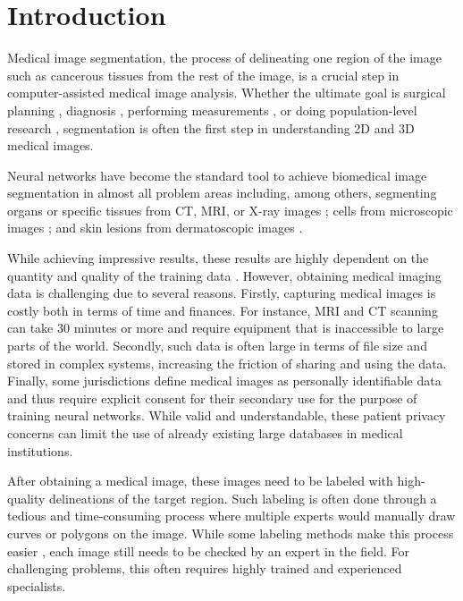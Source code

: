
\chapter{Introduction}
\label{chap:introduction}

Medical image segmentation, the process of delineating one region of the image such as cancerous tissues from the rest of the image, is a crucial step in computer-assisted medical image analysis. Whether the ultimate goal is surgical planning \cite{selleAnalysisVasculatureLiver2002}, diagnosis \cite{devunooruDeepLearningNeural2021}, performing measurements \cite{sobhaniniaFetalUltrasoundImage2019}, or doing population-level research \cite{bastarrikaRelationshipCoronaryArtery2010}, segmentation is often the first step in understanding 2D and 3D medical images.

Neural networks have become the standard tool to achieve biomedical image segmentation in almost all problem areas including, among others, segmenting organs or specific tissues from CT, MRI, or X-ray images \cite{antonelliMedicalSegmentationDecathlon2022}; cells from microscopic images \cite{edlundLIVECellLargescaleDataset2021}; and skin lesions from dermatoscopic images \cite{codellaSkinLesionAnalysis2019c}.

While achieving impressive results, these results are highly dependent on the quantity and quality of the training data \cite{choHowMuchData2016}. However, obtaining medical imaging data is challenging due to several reasons. Firstly, capturing medical images is costly both in terms of time and finances. For instance, MRI and CT scanning can take 30 minutes or more and require equipment that is inaccessible to large parts of the world. Secondly, such data is often large in terms of file size and stored in complex systems, increasing the friction of sharing and using the data. Finally, some jurisdictions define medical images as personally identifiable data \cite{lotanMedicalImagingPrivacy2020} and thus require explicit consent for their secondary use for the purpose of training neural networks. While valid and understandable, these patient privacy concerns can limit the use of already existing large databases in medical institutions.

After obtaining a medical image, these images need to be labeled with high-quality delineations of the target region. Such labeling is often done through a tedious and time-consuming process where multiple experts would manually draw curves or polygons on the image. While some labeling methods make this process easier \cite{lutnickIntegratedIterativeAnnotation2019}, each image still needs to be checked by an expert in the field. For challenging problems, this often requires highly trained and experienced specialists.

